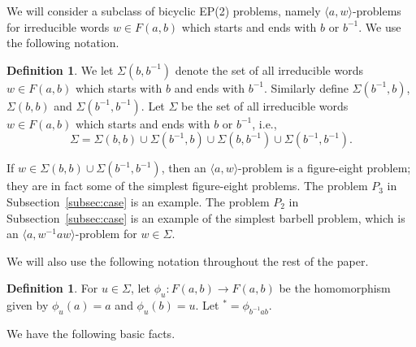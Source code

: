 \documentclass[11pt]{amsart}
\theoremstyle{definition}
\newtheorem{definition}[theorem]{Definition}
\theoremstyle{definition}
\numberwithin{equation}{section}
\begin{document}
We will consider a subclass of bicyclic EP(2) problems, namely $\langle a, w\rangle$-problems for irreducible words $w\in F(a, b)$ which starts and ends with $b$ or $b^{-1}$. We use the following notation.

\begin{definition} We let $\Sigma(b, b^{-1})$ denote the set of all irreducible words $w\in F(a, b)$ which starts with $b$ and ends with $b^{-1}$. Similarly define $\Sigma(b^{-1}, b)$, $\Sigma(b, b)$ and $\Sigma(b^{-1}, b^{-1})$. Let $\Sigma$ be the set of all irreducible words $w\in F(a, b)$ which starts and ends with $b$ or $b^{-1}$, i.e., 
$$ \Sigma=\Sigma(b,b)\cup \Sigma(b^{-1}, b)\cup \Sigma(b, b^{-1})\cup \Sigma(b^{-1}, b^{-1}). $$
\end{definition}

If $w\in \Sigma(b, b)\cup \Sigma(b^{-1}, b^{-1})$, then an $\langle a, w\rangle$-problem is a figure-eight problem; they are in fact some of the simplest figure-eight problems. The problem $P_3$ in Subsection~\ref{subsec:case} is an example. The problem $P_2$ in Subsection~\ref{subsec:case} is an example of the simplest barbell problem, which is an $\langle a, w^{-1}aw\rangle$-problem for $w\in \Sigma$. 

We will also use the following notation throughout the rest of the paper.

\begin{definition}\label{def:*} For $u\in \Sigma$, let $\phi_u\colon F(a, b)\to F(a, b)$ be the homomorphism given by $\phi_u(a)=a$ and $\phi_u(b)=u$. Let ${}^*=\phi_{b^{-1}ab}$.
\end{definition}

We have the following basic facts.
\end{document}
